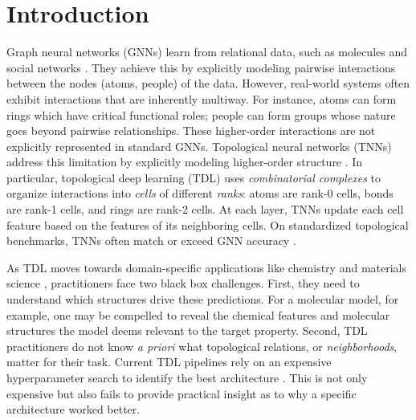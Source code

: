 \section{Introduction}
\label{sec:introduction}

Graph neural networks (GNNs) learn from relational data, such as molecules and social networks \citep{kipf2017semisupervised}. They achieve this by explicitly modeling pairwise interactions between the nodes (atoms, people) of the data. However, real-world systems often exhibit interactions that are inherently multiway. For instance, atoms can form rings which have critical functional roles; people can form groups whose nature goes beyond pairwise relationships. These higher-order interactions are not explicitly represented in standard GNNs. Topological neural networks (TNNs) address this limitation by explicitly modeling higher-order structure \citep{hajij2023tdl,papillon2023architectures}. In particular, topological deep learning (TDL) uses \emph{combinatorial complexes} to organize interactions into \emph{cells} of different \emph{ranks}: atoms are rank-0 cells, bonds are rank-1 cells, and rings are rank-2 cells. At each layer, TNNs update each cell feature based on the features of its neighboring cells. On standardized topological benchmarks, TNNs often match or exceed GNN accuracy \citep{telyatnikov2024topobench}.

As TDL moves towards domain-specific applications like chemistry and materials science \citep{papamarkou2024position}, practitioners face two black box challenges. First, they need to understand which structures drive these predictions. For a molecular model, for example, one may be compelled to reveal the chemical features and molecular structures the model deems relevant to the target property. Second, TDL practitioners do not know \textit{a priori} what topological relations, or \textit{neighborhoods}, matter for their task. Current TDL pipelines rely on an expensive hyperparameter search to identify the best architecture \citep{papillon2025topotune,hopse2025}. This is not only expensive but also fails to provide practical insight as to why a specific architecture worked better. 

